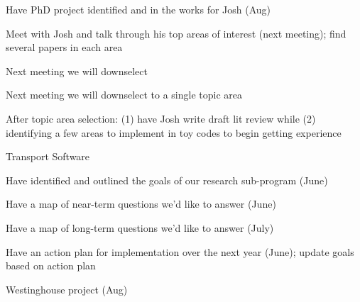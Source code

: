 \documentclass[12pt,twoside]{article}
\begin{document}
\begin{compactitem}
\item Have PhD project identified and in the works for Josh (Aug)
  \begin{compactitem}
  \item Meet with Josh and talk through his top areas of interest (next meeting); find several papers in each area
  \item Next meeting we will downselect
  \item Next meeting we will downselect to a single topic area
  \item After topic area selection: (1) have Josh write draft lit review while (2) identifying a few areas to implement in toy codes to begin getting experience
  \end{compactitem}

\item Transport Software
  \begin{compactitem}
  \item Have identified and outlined the goals of our research sub-program (June)
  \item Have a map of near-term questions we'd like to answer (June)
  \item Have a map of long-term questions we'd like to answer (July)
  \item Have an action plan for implementation over the next year (June); update goals based on action plan
  \end{compactitem}
\item Westinghouse project (Aug)
\end{compactitem}
\end{document}

